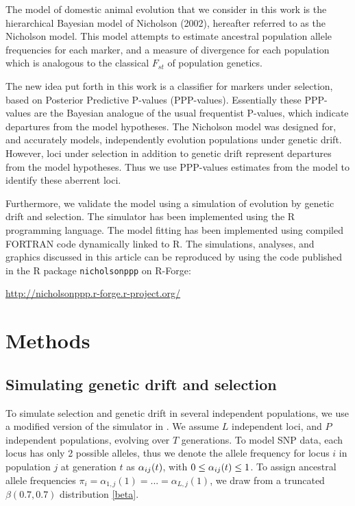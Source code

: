 \documentclass[a4paper,12pt]{article}
\begin{document}
The model of domestic animal evolution that we consider in this work
is the hierarchical Bayesian model of Nicholson \etal
(2002)\cite{nicholson}, hereafter referred to as the Nicholson
model. This model attempts to estimate ancestral population allele
frequencies for each marker, and a measure of divergence for each
population which is analogous to the classical $F_{st}$ of population
genetics.

The new idea put forth in this work is a classifier for markers under
selection, based on Posterior Predictive P-values
(PPP-values)\cite{pppvalues}. Essentially these PPP-values are the
Bayesian analogue of the usual frequentist P-values, which indicate
departures from the model hypotheses. The Nicholson model was designed
for, and accurately models, independently evolution populations under
genetic drift. However, loci under selection in addition to genetic
drift represent departures from the model hypotheses. Thus we use
PPP-values estimates from the model to identify these aberrent loci.

Furthermore, we validate the model using a simulation of evolution by
genetic drift and selection. The simulator has been implemented using
the R programming language\cite{R}. The model fitting has been
implemented using compiled FORTRAN code dynamically linked to R. The
simulations, analyses, and graphics discussed in this article can be
reproduced by using the code published in the R package
\texttt{nicholsonppp} on R-Forge\cite{R-Forge}:

 \url{http://nicholsonppp.r-forge.r-project.org/}

\section{Methods}

\subsection{Simulating genetic drift and selection}

To simulate selection and genetic drift in several independent
populations, we use a modified version of the simulator in
\cite{Beaumont-Balding}. We assume $L$ independent loci, and $P$
independent populations, evolving over $T$ generations. To model SNP
data, each locus has only 2 possible alleles, thus we denote the
allele frequency for locus $i$ in population $j$ at generation $t$ as
$\alpha_{ij}(t)$, with $0\leq \alpha_{ij}(t)\leq 1$. To assign ancestral allele
frequencies $\pi_i=\alpha_{1,j}(1)=...=\alpha_{L,j}(1)$, we draw from a truncated
$\beta(0.7,0.7)$ distribution \autoref{beta}.
\end{document}
